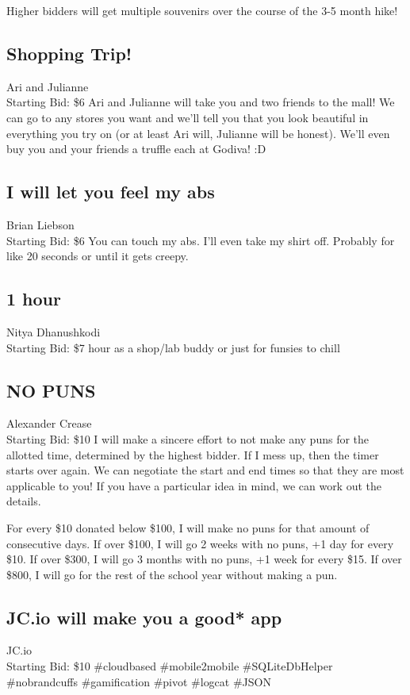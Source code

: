 \documentclass[11pt]{article}
\begin{document}
Higher bidders will get multiple souvenirs over the course of the 3-5 month hike!
\subsection{Shopping Trip!}
Ari and Julianne
\\
Starting Bid: \$6
\newline
Ari and Julianne will take you and two friends to the mall! We can go to any stores you want and we'll tell you that you look beautiful in everything you try on (or at least Ari will, Julianne will be honest). We'll even buy you and your friends a truffle each at Godiva! :D
\subsection{I will let you feel my abs}
Brian Liebson
\\
Starting Bid: \$6
\newline
You can touch my abs. I'll even take my shirt off. Probably for like 20 seconds or until it gets creepy.
\subsection{1 hour}
Nitya Dhanushkodi
\\
Starting Bid: \$7
 hour as a shop/lab buddy or just for funsies to chill
\subsection{NO PUNS}
Alexander Crease
\\
Starting Bid: \$10
\newline
I will make a sincere effort to not make any puns for the allotted time, determined by the highest bidder. If I mess up, then the timer starts over again. We can negotiate the start and end times so that they are most applicable to you! If you have a particular idea in mind, we can work out the details.

For every \$10 donated below \$100, I will make no puns for that amount of consecutive days.
If over \$100, I will go 2 weeks with no puns, +1 day for every \$10.
If over \$300, I will go 3 months with no puns, +1 week for every \$15. 
If over \$800, I will go for the rest of the school year without making a pun.
\subsection{JC.io will make you a good* app}
JC.io
\\
Starting Bid: \$10
\newline
\#cloudbased \#mobile2mobile \#SQLiteDbHelper \#nobrandcuffs \#gamification \#pivot \#logcat \#JSON
\end{document}
